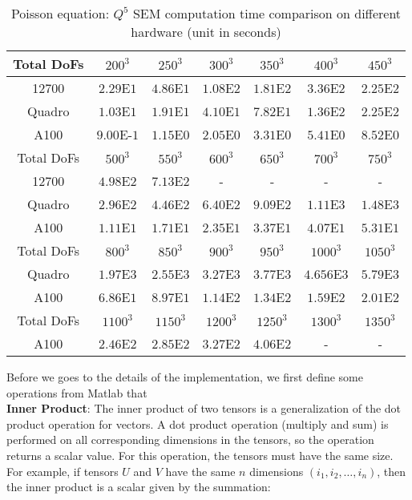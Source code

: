 \begin{table}[ht!]
    \centering
    \begin{tabular}{|c|c|c|c|c|c|c|}
    \hline
         Total DoFs & $200^3$ & $250^3$ & $300^3$ & $350^3$ & $400^3$ & $450^3$\\
    \hline
         12700 & $2.29$E$1$ & $4.86$E$1$ & $1.08$E$2$ & $1.81$E$2$ & $3.36$E$2$ &
         $2.25$E$2$\\
    \hline
         Quadro & $1.03$E$1$ & $1.91$E$1$ & $4.10$E$1$ & $7.82$E$1$ & $1.36$E$2$ &
         $2.25$E$2$\\

    \hline
         A100 & $9.00$E-$1$ & $1.15$E$0$ & $2.05$E$0$ & $3.31$E$0$ & $5.41$E$0$ &
         $8.52$E$0$\\
    \hline
    \hline
         Total DoFs & $500^3$ & $550^3$ & $600^3$ & $650^3$ & $700^3$ & $750^3$\\
    \hline
         12700 & $4.98$E$2$ & $7.13$E$2$ & - & - & - & - \\
    \hline
         Quadro & $2.96$E$2$ & $4.46$E$2$ & $6.40$E$2$ & $9.09$E$2$ & $1.11$E$3$ &
         $1.48$E$3$\\
    \hline
         A100 & $1.11$E$1$ & $1.71$E$1$ & $2.35$E$1$ & $3.37$E$1$ & $4.07$E$1$ &
         $5.31$E$1$\\
    \hline
    \hline
         Total DoFs & $800^3$ & $850^3$ & $900^3$ & $950^3$ & $1000^3$ & $1050^3$\\
    \hline
         Quadro & $1.97$E$3$ & $2.55$E$3$ & $3.27$E$3$ & $3.77$E$3$ & $4.656$E$3$ & $5.79$E$3$\\
    \hline
         A100  & $6.86$E$1$ & $8.97$E$1$ & $1.14$E$2$ & $1.34$E$2$ & $1.59$E$2$ &
         $2.01$E$2$\\
    \hline
    \hline
         Total DoFs & $1100^3$ & $1150^3$ & $1200^3$ & $1250^3$ & $1300^3$ & $1350^3$\\
    \hline
         A100 & $2.46$E$2$ & $2.85$E$2$ & $3.27$E$2$ & $4.06$E$2$ & - & -\\
    \hline
    \end{tabular}
    \caption{Poisson equation: $Q^5$ SEM computation time comparison on different hardware (unit in seconds)}
    \label{tab3: poisson_CPU_GPU}
\end{table}
Before we goes to the details of the implementation, we first define some operations from Matlab that\\
\textbf{Inner Product}:
The inner product of two tensors is a generalization of the dot product operation for vectors. A dot product operation (multiply and sum) is performed on all corresponding dimensions in the tensors, so the operation returns a scalar value. For this operation, the tensors must have the same size. For example, if tensors $U$ and $V$ have the same $n$ dimensions $(i_1, i_2,\ldots, i_n)$, then the inner product  is a scalar given by the summation:
